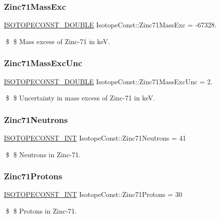 \subsubsection{\texorpdfstring{Zinc71\+Mass\+Exc}{Zinc71MassExc}}
{\footnotesize\ttfamily \mbox{\hyperlink{group___isotope_const-_macros_ga8f45a7272ce02c0b4c65c44636ed719a}{I\+S\+O\+T\+O\+P\+E\+C\+O\+N\+S\+T\+\_\+\+D\+O\+U\+B\+LE}} Isotope\+Const\+::\+Zinc71\+Mass\+Exc = -\/67328.}

\$ \$ Mass excess of Zinc-\/71 in keV. \mbox{\label{group___isotope_const-_zinc-_zn71_gabe77c728de28f9890b247f4a7b445abc}} 
\subsubsection{\texorpdfstring{Zinc71\+Mass\+Exc\+Unc}{Zinc71MassExcUnc}}
{\footnotesize\ttfamily \mbox{\hyperlink{group___isotope_const-_macros_ga8f45a7272ce02c0b4c65c44636ed719a}{I\+S\+O\+T\+O\+P\+E\+C\+O\+N\+S\+T\+\_\+\+D\+O\+U\+B\+LE}} Isotope\+Const\+::\+Zinc71\+Mass\+Exc\+Unc = 2.}

\$ \$ Uncertainty in mass excess of Zinc-\/71 in keV. \mbox{\label{group___isotope_const-_zinc-_zn71_ga7408b90101e8004d1c9794962745de38}} 
\subsubsection{\texorpdfstring{Zinc71\+Neutrons}{Zinc71Neutrons}}
{\footnotesize\ttfamily \mbox{\hyperlink{group___isotope_const-_macros_ga5f18360b3e99483a35c32d789e62621c}{I\+S\+O\+T\+O\+P\+E\+C\+O\+N\+S\+T\+\_\+\+I\+NT}} Isotope\+Const\+::\+Zinc71\+Neutrons = 41}

\$ \$ Neutrons in Zinc-\/71. \mbox{\label{group___isotope_const-_zinc-_zn71_gac93d23b80ab1903c2a12b11cfb0e3bc0}} 
\subsubsection{\texorpdfstring{Zinc71\+Protons}{Zinc71Protons}}
{\footnotesize\ttfamily \mbox{\hyperlink{group___isotope_const-_macros_ga5f18360b3e99483a35c32d789e62621c}{I\+S\+O\+T\+O\+P\+E\+C\+O\+N\+S\+T\+\_\+\+I\+NT}} Isotope\+Const\+::\+Zinc71\+Protons = 30}

\$ \$ Protons in Zinc-\/71. 